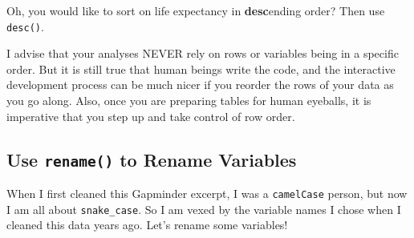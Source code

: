 \documentclass[]{book}
\newenvironment{Shaded}{\begin{snugshade}}{\end{snugshade}}
\newcommand{\KeywordTok}[1]{\textcolor[rgb]{0.13,0.29,0.53}{\textbf{#1}}}
\newcommand{\DecValTok}[1]{\textcolor[rgb]{0.00,0.00,0.81}{#1}}
\newcommand{\StringTok}[1]{\textcolor[rgb]{0.31,0.60,0.02}{#1}}
\newcommand{\CommentTok}[1]{\textcolor[rgb]{0.56,0.35,0.01}{\textit{#1}}}
\newcommand{\OperatorTok}[1]{\textcolor[rgb]{0.81,0.36,0.00}{\textbf{#1}}}
\newcommand{\NormalTok}[1]{#1}
\begin{document}
Oh, you would like to sort on life expectancy in \textbf{desc}ending
order? Then use \texttt{desc()}.

\begin{Shaded}
\end{Shaded}

I advise that your analyses NEVER rely on rows or variables being in a
specific order. But it is still true that human beings write the code,
and the interactive development process can be much nicer if you reorder
the rows of your data as you go along. Also, once you are preparing
tables for human eyeballs, it is imperative that you step up and take
control of row order.

\subsection{\texorpdfstring{Use \texttt{rename()} to Rename
Variables}{Use rename() to Rename Variables}}\label{use-rename-to-rename-variables}

When I first cleaned this Gapminder excerpt, I was a \texttt{camelCase}
person, but now I am all about \texttt{snake\_case}. So I am vexed by
the variable names I chose when I cleaned this data years ago. Let's
rename some variables!
\end{document}
